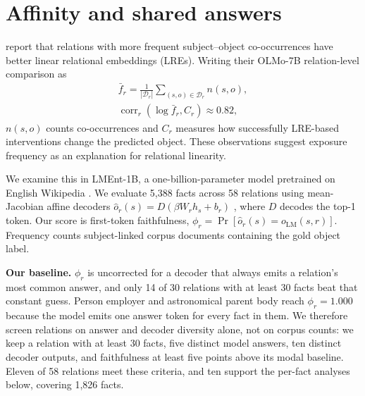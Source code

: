 \section{Affinity and shared answers}
\label{sec:lment-frequency}

\citet{merullo2025frequency} report that relations with more frequent
subject--object co-occurrences have better linear relational embeddings (LREs).
Writing their OLMo-7B relation-level comparison as
\begin{equation}
  \begin{gathered}
    \bar f_r=\frac{1}{|\mathcal D_r|}\sum_{(s,o)\in\mathcal D_r}n(s,o), \\
    \operatorname{corr}_r(\log\bar f_r,C_r)\approx0.82,
  \end{gathered}
  \label{eq:merullo-frequency}
\end{equation}
$n(s,o)$ counts co-occurrences and $C_r$ measures how successfully LRE-based
interventions change the predicted object. These observations suggest exposure
frequency as an explanation for relational linearity.

We examine this in LMEnt-1B, a one-billion-parameter model pretrained on English
Wikipedia \citep{gottesman2025lment}. We evaluate 5,388 facts across 58 relations
using mean-Jacobian affine decoders $\hat o_r(s)=D(\beta W_r h_s+b_r)$
\citep{hernandez2024linearity}, where $D$ decodes the top-1 token. Our score is
first-token faithfulness, $\phi_r=\Pr[\hat o_r(s)=o_{\mathrm{LM}}(s,r)]$.
Frequency counts subject-linked corpus documents containing the gold object label.

\textbf{Our baseline.}
$\phi_r$ is uncorrected for a decoder that always emits a relation's most common
answer, and only 14 of 30 relations with at least 30 facts beat that constant
guess. Person employer and astronomical parent body reach $\phi_r=1.000$ because
the model emits one answer token for every fact in them. We therefore screen
relations on answer and decoder diversity alone, not on corpus counts: we keep a
relation with at least 30 facts, five distinct model answers, ten distinct decoder
outputs, and faithfulness at least five points above its modal baseline. Eleven of
58 relations meet these criteria, and ten support the per-fact analyses below, covering
1,826 facts.

